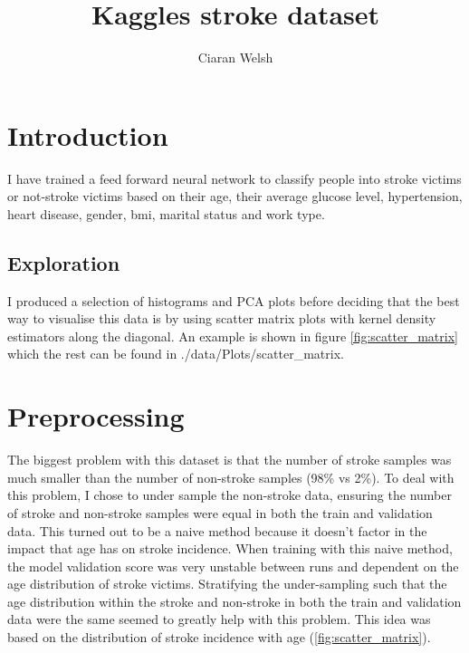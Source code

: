 \documentclass[12pt]{article}
\title{Kaggles stroke dataset}
\author{Ciaran Welsh}
\begin{document}
    \maketitle

    \section{Introduction}
    I have trained a feed forward neural network to classify people into stroke victims or not-stroke victims
    based on their age, their average glucose level, hypertension, heart disease, gender, bmi, marital status and
    work type.
    \subsection{Exploration}
    I produced a selection of histograms and PCA plots before deciding that the best way to visualise this data is by
    using scatter matrix plots with kernel density estimators along the diagonal. An example is shown in
    figure \cref{fig:scatter_matrix} which the rest can be found in ./data/Plots/scatter_matrix.

    \section{Preprocessing}
    The biggest problem with this dataset is that the number of stroke samples was much smaller than the number
    of non-stroke samples (98\% vs 2\%). To deal with this problem, I chose to under sample the non-stroke
    data, ensuring the number of stroke and non-stroke samples were equal in both the train and validation data. This turned
    out to be a naive method because it doesn't factor in the impact that age has on stroke incidence. When training
    with this naive method, the model validation score was very unstable between runs and dependent on the
    age distribution of stroke victims. Stratifying the under-sampling such that the age distribution
    within the stroke and non-stroke in both the train and validation data were the same seemed to greatly help with
    this problem. This idea was based on the distribution of stroke incidence with age (\cref{fig:scatter_matrix}).
\end{document}
